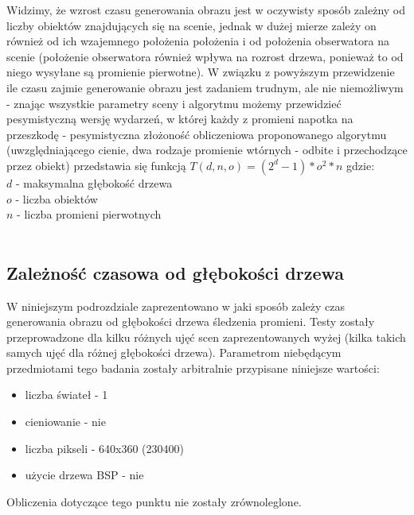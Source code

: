 Widzimy, że wzrost czasu generowania obrazu jest w oczywisty sposób zależny od liczby obiektów znajdujących się na scenie, jednak w dużej mierze zależy on również od ich wzajemnego położenia położenia i od położenia obserwatora na scenie (położenie obserwatora również wpływa na rozrost drzewa, ponieważ to od niego wysyłane są promienie pierwotne). W związku z powyższym przewidzenie ile czasu zajmie generowanie obrazu jest zadaniem trudnym, ale nie niemożliwym - znając wszystkie parametry sceny i algorytmu możemy przewidzieć pesymistyczną wersję wydarzeń, w której każdy z promieni napotka na przeszkodę - pesymistyczna złożoność obliczeniowa proponowanego algorytmu (uwzględniającego cienie, dwa rodzaje promienie wtórnych - odbite i przechodzące przez obiekt) przedstawia się funkcją $T(d,n,o) = (2^d - 1) * o^2 * n$ gdzie:
\\
$d$ - maksymalna głębokość drzewa \\
$o$ - liczba obiektów \\
$n$ - liczba promieni pierwotnych \\ 
\\
\subsection{Zależność czasowa od głębokości drzewa}

W niniejszym podrozdziale zaprezentowano w jaki sposób zależy czas generowania obrazu od głębokości drzewa śledzenia promieni. Testy zostały przeprowadzone dla kilku różnych ujęć scen zaprezentowanych wyżej (kilka takich samych ujęć dla różnej głębokości drzewa). Parametrom niebędącym przedmiotami tego badania zostały arbitralnie przypisane niniejsze wartości:

\begin{itemize}

\item liczba świateł - 1
\item cieniowanie - nie
\item liczba pikseli - 640x360 (230400)
\item użycie drzewa BSP - nie

\end{itemize}

Obliczenia dotyczące tego punktu nie zostały zrównoleglone.

